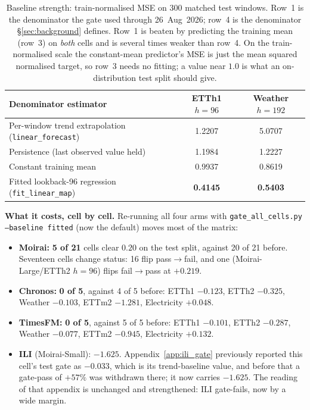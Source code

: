 \begin{table}[ht]
\centering\small
\caption{Baseline strength: train-normalised MSE on 300 matched test windows.
Row~1 is the denominator the gate used through 26~Aug~2026; row~4 is the
denominator \S\ref{sec:background} defines. Row~1 is beaten by predicting the
training mean (row~3) on \emph{both} cells and is several times weaker than
row~4. On the train-normalised scale the constant-mean predictor's MSE is just
the mean squared normalised target, so row~3 needs no fitting; a value near
$1.0$ is what an on-distribution test split should give.}
\label{tab:gate_baselines}
\begin{tabular}{@{}lcc@{}}
\toprule
Denominator estimator & ETTh1 $h{=}96$ & Weather $h{=}192$ \\
\midrule
Per-window trend extrapolation (\texttt{linear\_forecast}) & 1.2207 & 5.0707 \\
Persistence (last observed value held) & 1.1984 & 1.2227 \\
Constant training mean & 0.9937 & 0.8619 \\
Fitted lookback-96 regression (\texttt{fit\_linear\_map}) & \textbf{0.4145} & \textbf{0.5403} \\
\bottomrule
\end{tabular}
\end{table}

\textbf{What it costs, cell by cell.} Re-running all four arms with
\texttt{gate\_all\_cells.py --baseline fitted} (now the default) moves most of
the matrix:

\begin{itemize}\itemsep1pt
\item \textbf{Moirai:} \textbf{5 of 21} cells clear $0.20$ on the test split,
  against 20 of 21 before. Seventeen cells change status: 16 flip
  pass${\to}$fail, and one (Moirai-Large/ETTh2 $h{=}96$) flips fail${\to}$pass
  at $+0.219$.
\item \textbf{Chronos:} \textbf{0 of 5}, against 4 of 5 before: ETTh1
  $-0.123$, ETTh2 $-0.325$, Weather $-0.103$, ETTm2 $-1.281$, Electricity
  $+0.048$.
\item \textbf{TimesFM:} \textbf{0 of 5}, against 5 of 5 before: ETTh1
  $-0.101$, ETTh2 $-0.287$, Weather $-0.077$, ETTm2 $-0.945$, Electricity
  $+0.132$.
\item \textbf{ILI} (Moirai-Small): $\mathbf{-1.625}$. Appendix~\ref{app:ili_gate}
  previously reported this cell's test gate as $-0.033$, which is its
  trend-baseline value, and before that a gate-pass of $+57\%$ was withdrawn
  there; it now carries $-1.625$. The reading of that appendix is unchanged and
  strengthened: ILI gate-fails, now by a wide margin.
\end{itemize}


